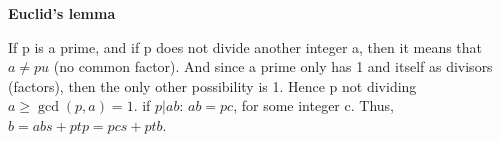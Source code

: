 \textbf{Euclid’s lemma}

If p is a prime, and if p does not divide another integer a, then it means that $a \neq pu$ (no common factor).
And since a prime only has 1 and itself as divisors (factors), then the only other possibility is 1.
Hence p not dividing $a \geq \gcd(p, a) = 1$.
if $p | ab$: $ab = pc$, for some integer c.
Thus, $b = abs + ptp = pcs + ptb$.
\\~\\

